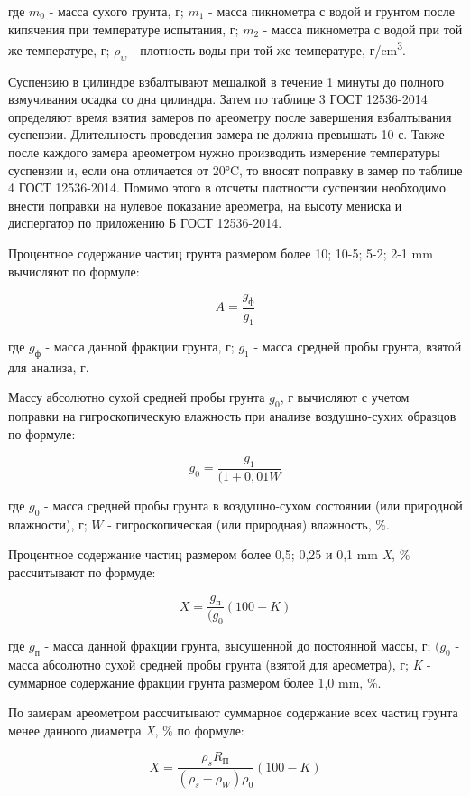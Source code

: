 где $m_0$ - масса сухого грунта, г;
$m_1$ - масса пикнометра с водой и грунтом после кипячения при
температуре испытания, г;
$m_2$ - масса пикнометра с водой при той же температуре, г;
$\rho_w$ - плотность воды при той же температуре, г/\si{\centi\meter^3}.

Суспензию в цилиндре взбалтывают мешалкой в течение 1 минуты до полного взмучивания осадка 
со дна цилиндра. Затем по таблице 3 ГОСТ 12536-2014 определяют время взятия замеров по ареометру 
после завершения взбалтывания суспензии. Длительность проведения замера не должна 
превышать 10 с. Также после каждого замера ареометром нужно производить измерение 
температуры суспензии и, если она отличается от 20\si{\degreeCelsius}, то вносят 
поправку в замер по таблице 4 ГОСТ 12536-2014. Помимо этого в отсчеты плотности 
суспензии необходимо внести поправки на нулевое показание ареометра, на высоту 
мениска и диспергатор по приложению Б ГОСТ 12536-2014.

Процентное содержание частиц грунта размером более 10; 10-5; 5-2; 2-1 \si{\milli\meter} 
вычисляют по формуле:

\[
   A = \frac{g_\text{ф}}{g_1}
\]

где $g_\text{ф}$ - масса данной фракции грунта, г;
$g_1$ - масса средней пробы грунта, взятой для анализа, г.

Массу абсолютно сухой средней пробы грунта $g_0$, г вычисляют с
учетом поправки на гигроскопическую влажность при анализе воздушно-сухих
образцов по формуле:

\[
   g_0 = \frac{g_1}{(1+0,01W}
\]

где $g_0$ - масса средней пробы грунта в воздушно-сухом состоянии (или
природной влажности), г;
$W$ - гигроскопическая (или природная) влажность, \%.

Процентное содержание частиц размером более 0,5; 0,25 и 0,1 \si{\milli\meter} 
\textit{X}, \% рассчитывают по формуде: 

\[
   X = \frac{g_\text{п}}{(g_0}(100-K)
\]

где $g_\text{п}$ - масса данной фракции грунта, высушенной до постоянной массы, г;
$(g_0$ - масса абсолютно сухой средней пробы грунта (взятой для ареометра), г;
\textit{K} - суммарное содержание фракции грунта размером более 1,0 \si{\milli\meter}, \%.

По замерам ареометром рассчитывают суммарное содержание всех частиц грунта 
менее данного диаметра \textit{X}, \% по формуле:

\[
   X = \frac{\rho_s R_\text{П}}{(\rho_s-\rho_W)\rho_0}(100-K)
\]

